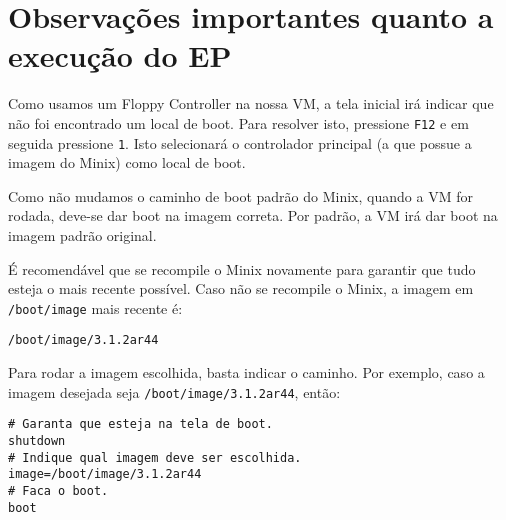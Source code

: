 \documentclass{amsart}
\theoremstyle{plain}
\newcommand{\code}[1]{\lstinline[mathescape=true]{#1}}
\begin{document}
\section{Observações importantes quanto a execução do EP}

Como usamos um Floppy Controller na nossa VM, a tela inicial irá indicar que não foi encontrado um
local de boot. Para resolver isto, pressione \code{F12} e em seguida pressione \code{1}. Isto
selecionará o controlador principal (a que possue a imagem do Minix) como local de boot.

Como não mudamos o caminho de boot padrão do Minix, quando a VM for rodada, deve-se dar boot na
imagem correta. Por padrão, a VM irá dar boot na imagem padrão original.

É recomendável que se recompile o Minix novamente para garantir que tudo esteja o mais recente
possível. Caso não se recompile o Minix, a imagem em \code{/boot/image} mais recente é:

\begin{lstlisting}[frame=leftline,mathescape=true,style=nonumbers]
/boot/image/3.1.2ar44
\end{lstlisting}

Para rodar a imagem escolhida, basta indicar o caminho. Por exemplo, caso a imagem desejada seja
\code{/boot/image/3.1.2ar44}, então:

\begin{lstlisting}[frame=leftline,mathescape=true,style=nonumbers]
# Garanta que esteja na tela de boot.
shutdown
# Indique qual imagem deve ser escolhida.
image=/boot/image/3.1.2ar44
# Faca o boot.
boot
\end{lstlisting}
\end{document}
